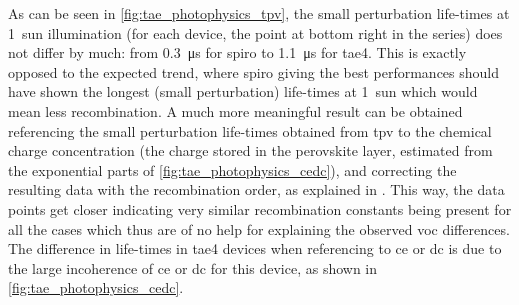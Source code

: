 	As can be seen in \cref{fig:tae_photophysics_tpv}, the small perturbation life-times at \SI{1}{sun} illumination (for each device, the point at bottom right in the series) does not differ by much: from \SI{0.3}{\us} for \gls{spiro} to \SI{1.1}{\us} for \gls{tae4}.
	This is exactly opposed to the expected trend, where \gls{spiro} giving the best performances should have shown the longest (small perturbation) life-times at 1~sun which would mean less recombination.
	A much more meaningful result can be obtained referencing the small perturbation life-times obtained from \gls{tpv} to the chemical charge concentration (the charge stored in the perovskite layer, estimated from the exponential parts of \cref{fig:tae_photophysics_cedc}), and correcting the resulting data with the recombination order, as explained in .
	This way, the data points get closer indicating very similar recombination constants being present for all the cases which thus are of no help for explaining the observed \gls{voc} differences.
	The difference in life-times in \gls{tae4} devices when referencing to \gls{ce} or \gls{dc} is due to the large incoherence of \gls{ce} or \gls{dc} for this device, as shown in \cref{fig:tae_photophysics_cedc}.
	


